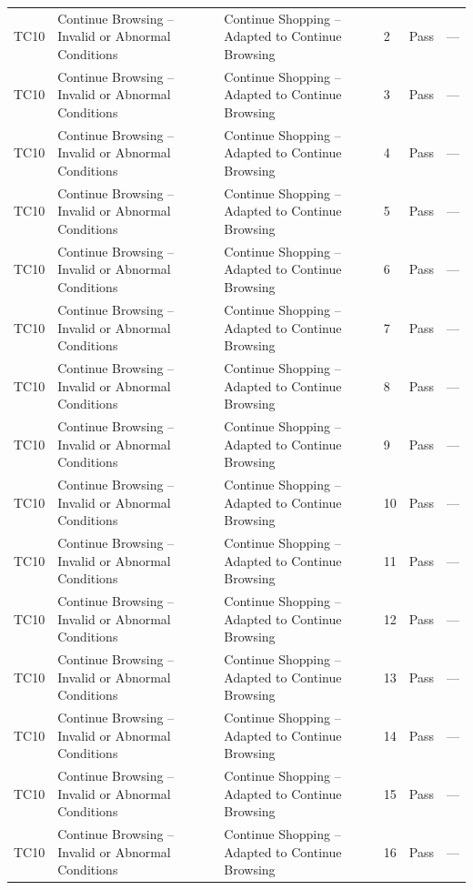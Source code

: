 {\begin{longtable}{@{}p{1.2cm} p{4.2cm} p{4.4cm} p{0.8cm} p{0.9cm} p{1.6cm}@{}}
  TC10 & Continue Browsing -- Invalid or Abnormal Conditions & Continue Shopping -- Adapted to Continue Browsing & 2 & Pass & --- \\
  TC10 & Continue Browsing -- Invalid or Abnormal Conditions & Continue Shopping -- Adapted to Continue Browsing & 3 & Pass & --- \\
  TC10 & Continue Browsing -- Invalid or Abnormal Conditions & Continue Shopping -- Adapted to Continue Browsing & 4 & Pass & --- \\
  TC10 & Continue Browsing -- Invalid or Abnormal Conditions & Continue Shopping -- Adapted to Continue Browsing & 5 & Pass & --- \\
  TC10 & Continue Browsing -- Invalid or Abnormal Conditions & Continue Shopping -- Adapted to Continue Browsing & 6 & Pass & --- \\
  TC10 & Continue Browsing -- Invalid or Abnormal Conditions & Continue Shopping -- Adapted to Continue Browsing & 7 & Pass & --- \\
  TC10 & Continue Browsing -- Invalid or Abnormal Conditions & Continue Shopping -- Adapted to Continue Browsing & 8 & Pass & --- \\
  TC10 & Continue Browsing -- Invalid or Abnormal Conditions & Continue Shopping -- Adapted to Continue Browsing & 9 & Pass & --- \\
  TC10 & Continue Browsing -- Invalid or Abnormal Conditions & Continue Shopping -- Adapted to Continue Browsing & 10 & Pass & --- \\
  TC10 & Continue Browsing -- Invalid or Abnormal Conditions & Continue Shopping -- Adapted to Continue Browsing & 11 & Pass & --- \\
  TC10 & Continue Browsing -- Invalid or Abnormal Conditions & Continue Shopping -- Adapted to Continue Browsing & 12 & Pass & --- \\
  TC10 & Continue Browsing -- Invalid or Abnormal Conditions & Continue Shopping -- Adapted to Continue Browsing & 13 & Pass & --- \\
  TC10 & Continue Browsing -- Invalid or Abnormal Conditions & Continue Shopping -- Adapted to Continue Browsing & 14 & Pass & --- \\
  TC10 & Continue Browsing -- Invalid or Abnormal Conditions & Continue Shopping -- Adapted to Continue Browsing & 15 & Pass & --- \\
  TC10 & Continue Browsing -- Invalid or Abnormal Conditions & Continue Shopping -- Adapted to Continue Browsing & 16 & Pass & --- \\

\end{longtable}}
